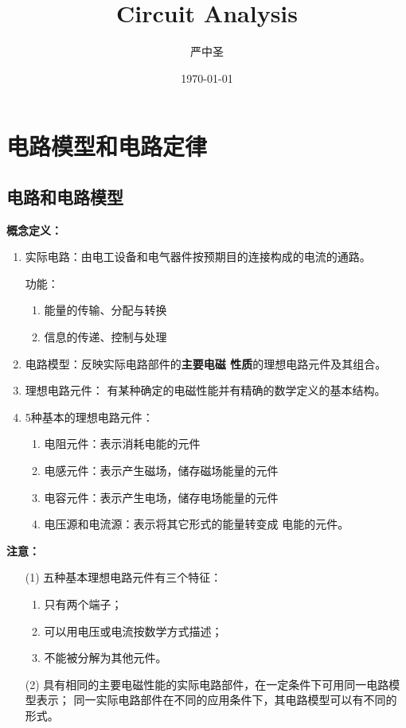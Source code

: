 \documentclass[11pt,a4paper,oneside]{book}
\title{\Huge Circuit Analysis}
\author{严中圣}
\date{\today}
\begin{document}
\maketitle
\tableofcontents  %
\chapter{电路模型和电路定律}
\section{电路和电路模型}
\textbf{概念定义：}
\begin{enumerate}
	\item 实际电路：由电工设备和电气器件按预期目的连接构成的电流的通路。
	
	功能：
	\begin{enumerate}
		\item 能量的传输、分配与转换
		\item 信息的传递、控制与处理
	\end{enumerate}
	\item 电路模型：反映实际电路部件的\textbf{主要电磁
	性质}的理想电路元件及其组合。
	\item 理想电路元件：
	有某种确定的电磁性能并有精确的数学定义的基本结构。
	\item 5种基本的理想电路元件：
	\begin{enumerate}
		\item 电阻元件：表示消耗电能的元件
		\item 电感元件：表示产生磁场，储存磁场能量的元件
		\item 电容元件：表示产生电场，储存电场能量的元件
		\item 电压源和电流源：表示将其它形式的能量转变成
		电能的元件。
	\end{enumerate}	
\end{enumerate}
\noindent \textbf{注意：}
\begin{enumerate}
	\item[(1)]五种基本理想电路元件有三个特征：
	\begin{enumerate}
		\item 只有两个端子；
		\item 可以用电压或电流按数学方式描述；
		\item 不能被分解为其他元件。
	\end{enumerate}
	\item[(2)] 具有相同的主要电磁性能的实际电路部件，在一定条件下可用同一电路模型表示；
	同一实际电路部件在不同的应用条件下，其电路模型可以有不同的形式。
\end{enumerate}
\end{document}
